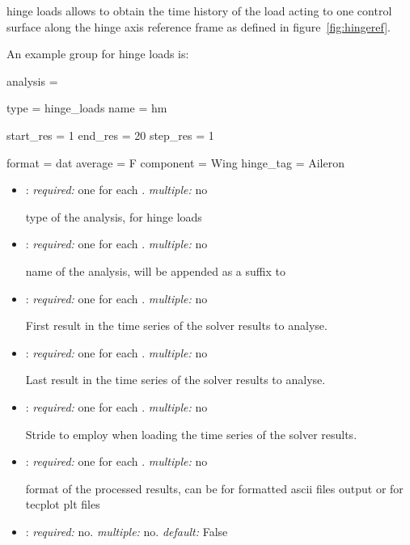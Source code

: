 hinge loads allows to obtain the time history of the load acting to one control surface along the hinge axis reference frame as defined in figure~\ref{fig:hingeref}. 

An example  group for hinge loads is:

\begin{inputfile}
analysis = {
  type = hinge_loads
  name = hm

  start_res = 1
  end_res = 20
  step_res = 1

  format = dat
  average = F
  component = Wing
  hinge_tag = Aileron
}
\end{inputfile}

\begin{itemize}
\item {}: \textit{required:} one for each . \textit{multiple:} no

type of the analysis,  for hinge loads

\item {}: \textit{required:} one for each . \textit{multiple:} no

name of the analysis, will be appended as a suffix to 

\item {}: \textit{required:} one for each . \textit{multiple:} no

First result in the time series of the solver results to analyse.

\item {}: \textit{required:} one for each . \textit{multiple:} no

Last result in the time series of the solver results to analyse.

\item {}: \textit{required:} one for each . \textit{multiple:} no

Stride to employ when loading the time series of the solver results. 

\item {}: \textit{required:} one for each . \textit{multiple:} no

format of the processed results, can be  for formatted ascii files output or  for tecplot plt files

\item {}: \textit{required:} no. \textit{multiple:} no. \textit{default:} False


\end{itemize}
